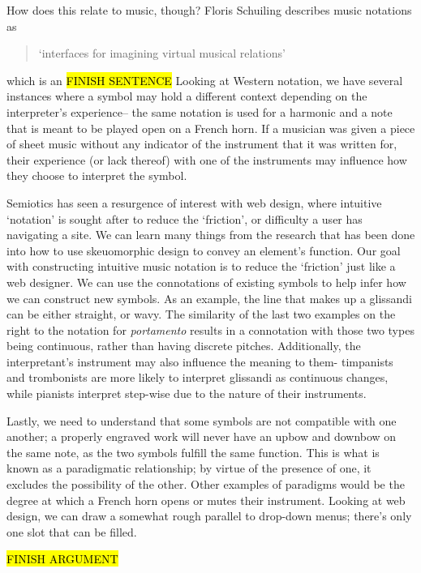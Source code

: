 How does this relate to music, though? 
Floris Schuiling describes music notations as \begin{quotation}
`interfaces for imagining virtual musical relations'
\end{quotation}
which is an \hl{FINISH SENTENCE}
Looking at Western notation, we have several instances where a symbol may hold a different context depending on the interpreter's experience-- 
the same notation is used for a harmonic and a note that is meant to be played open on a French horn.\autocite[]{schuilingNotationCulturesEthnomusicology2019}
If a musician was given a piece of sheet music without any indicator of the instrument that it was written for, their experience (or lack thereof) with one of the instruments may influence how they choose to interpret the symbol.

Semiotics has seen a resurgence of interest with web design, where intuitive `notation' is sought after to reduce the `friction', or difficulty a user has navigating a site.
We can learn many things from the research that has been done into how to use skeuomorphic design to convey an element's function.
Our goal with constructing intuitive music notation is to reduce the `friction' just like a web designer.
We can use the connotations of existing symbols to help infer how we can construct new symbols.
As an example, the line that makes up a glissandi can be either straight, or wavy.
The similarity of the last two examples on the right to the notation for \emph{portamento} results in a connotation with those two types being continuous, rather than having discrete pitches.
Additionally, the interpretant's instrument may also influence the meaning to them- timpanists and trombonists are more likely to interpret glissandi as continuous changes, while pianists interpret step-wise due to the nature of their instruments.\autocite[]{}

Lastly, we need to understand that some symbols are not compatible with one another; a properly engraved work will never have an upbow and downbow on the same note, as the two symbols fulfill the same function.
This is what is known as a paradigmatic relationship; by virtue of the presence of one, it excludes the possibility of the other.
Other examples of paradigms would be the degree at which a French horn opens or mutes their instrument.
Looking at web design, we can draw a somewhat rough parallel to drop-down menus; there's only one slot that can be filled.

\hl{FINISH ARGUMENT}